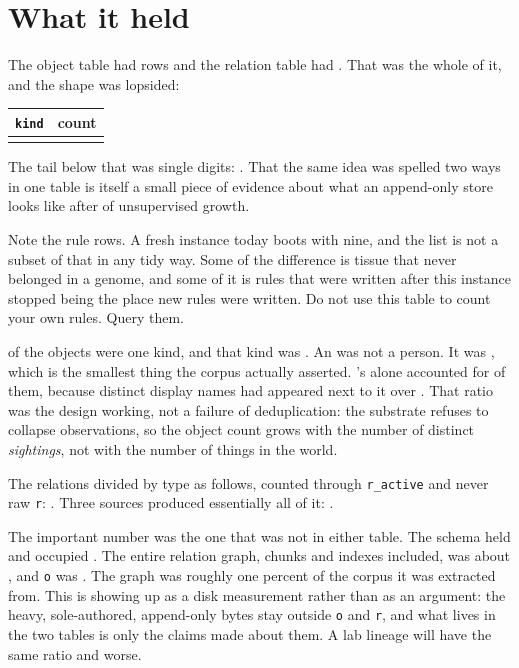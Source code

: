 \section{What it held}

The object table had \labLineageObjects{} rows and the relation table had \labLineageRelations{}. That was the whole of it, and the shape was lopsided:

\begin{center}
\begin{tabular}{lr}
\toprule
\textbf{\texttt{kind}} & \textbf{count} \\
\midrule
\labLineageKindTable{}
\bottomrule
\end{tabular}
\end{center}

The tail below that was single digits: \labLineageKindTail{}. \labLineageCorrectionSpelling{} That the same idea was spelled two ways in one table is itself a small piece of evidence about what an append-only store looks like after \labLineageLifetime{} of unsupervised growth.

Note the \labLineageRuleRows{} rule rows. A fresh instance today boots with nine, and the list is not a subset of that \labLineageRuleRows{} in any tidy way. Some of the difference is tissue that never belonged in a genome, and some of it is rules that were written after this instance stopped being the place new rules were written. Do not use this table to count your own rules. Query them.

\labLineageDominantFraction{} of the objects were one kind, and that kind was \labLineageDominantKind{}. An \texttt{\labLineageDominantObject{}} was not a person. It was \labLineageDominantObjectDef{}, which is the smallest thing the corpus actually asserted. \labColleague{}'s \labLineageSeatAddr{} alone accounted for \labLineageSeatCount{} of them, because \labLineageSeatCount{} distinct display names had appeared next to it over \labLineageSeatYears{}. That ratio was the design working, not a failure of deduplication: the substrate refuses to collapse observations, so the object count grows with the number of distinct \emph{sightings}, not with the number of things in the world.

The relations divided by type as follows, counted through \texttt{r\_active} and never raw \texttt{r}: \labLineageRelBreakdown{}. Three sources produced essentially all of it: \labLineageThreeSources{}.

The important number was the one that was not in either table. The \texttt{\labLineageBlobSchema{}} schema held \labLineageMessages{} \labLineageBlobUnit{} and occupied \labLineageBlobSize{}. The entire relation graph, chunks and indexes included, was about \labLineageGraphSize{}, and \texttt{o} was \labLineageOSize{}. The graph was roughly one percent of the corpus it was extracted from. This is  showing up as a disk measurement rather than as an argument: the heavy, sole-authored, append-only bytes stay outside \texttt{o} and \texttt{r}, and what lives in the two tables is only the claims made about them. A lab lineage will have the same ratio and worse. \labLineageBlobExample{}

